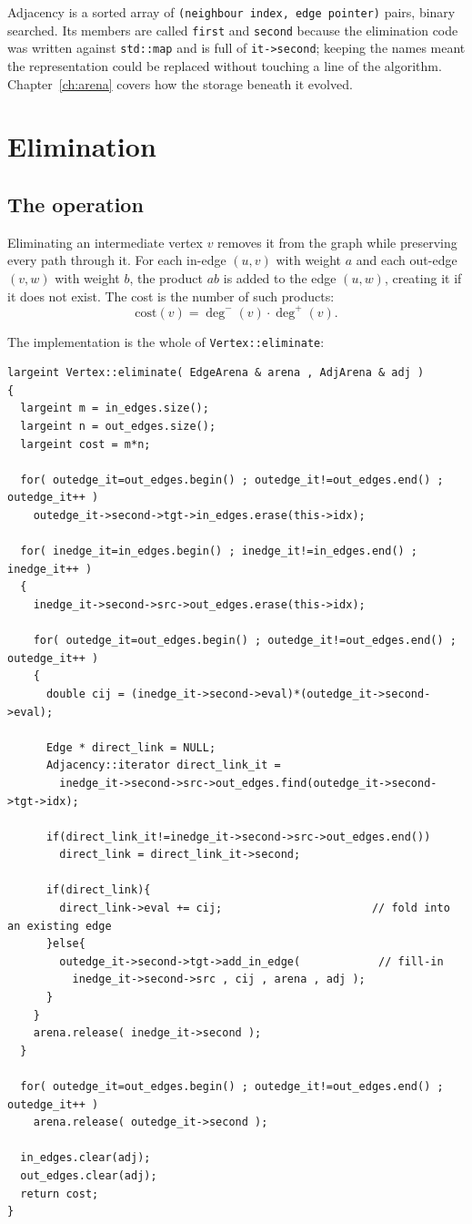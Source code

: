 \documentclass[11pt,a4paper]{report}
\newcommand{\code}[1]{\texttt{#1}}
\begin{document}
Adjacency is a sorted array of \code{(neighbour index, edge pointer)} pairs,
binary searched. Its members are called \code{first} and \code{second} because
the elimination code was written against \code{std::map} and is full of
\code{it->second}; keeping the names meant the representation could be replaced
without touching a line of the algorithm. Chapter~\ref{ch:arena} covers how the
storage beneath it evolved.

\chapter{Elimination}
\label{ch:elim}

\section{The operation}

Eliminating an intermediate vertex $v$ removes it from the graph while
preserving every path through it. For each in-edge $(u,v)$ with weight $a$ and
each out-edge $(v,w)$ with weight $b$, the product $ab$ is added to the edge
$(u,w)$, creating it if it does not exist. The cost is the number of such
products:
\[
  \mathrm{cost}(v) = \deg^{-}(v)\cdot\deg^{+}(v).
\]

The implementation is the whole of \code{Vertex::eliminate}:

\begin{lstlisting}
largeint Vertex::eliminate( EdgeArena & arena , AdjArena & adj )
{
  largeint m = in_edges.size();
  largeint n = out_edges.size();
  largeint cost = m*n;

  for( outedge_it=out_edges.begin() ; outedge_it!=out_edges.end() ; outedge_it++ )
    outedge_it->second->tgt->in_edges.erase(this->idx);

  for( inedge_it=in_edges.begin() ; inedge_it!=in_edges.end() ; inedge_it++ )
  {
    inedge_it->second->src->out_edges.erase(this->idx);

    for( outedge_it=out_edges.begin() ; outedge_it!=out_edges.end() ; outedge_it++ )
    {
      double cij = (inedge_it->second->eval)*(outedge_it->second->eval);

      Edge * direct_link = NULL;
      Adjacency::iterator direct_link_it =
        inedge_it->second->src->out_edges.find(outedge_it->second->tgt->idx);

      if(direct_link_it!=inedge_it->second->src->out_edges.end())
        direct_link = direct_link_it->second;

      if(direct_link){
        direct_link->eval += cij;                       // fold into an existing edge
      }else{
        outedge_it->second->tgt->add_in_edge(            // fill-in
          inedge_it->second->src , cij , arena , adj );
      }
    }
    arena.release( inedge_it->second );
  }

  for( outedge_it=out_edges.begin() ; outedge_it!=out_edges.end() ; outedge_it++ )
    arena.release( outedge_it->second );

  in_edges.clear(adj);
  out_edges.clear(adj);
  return cost;
}
\end{lstlisting}
\end{document}
